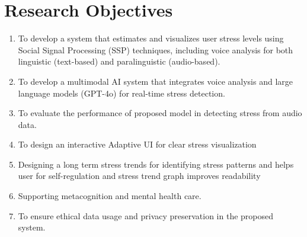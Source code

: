\documentclass[Arial,12pt,openright,twoside]{book}
\begin{document}
\section{Research Objectives}
\begin{enumerate}
    \item To develop a system that estimates and visualizes user stress levels using Social Signal Processing (SSP) techniques, including voice analysis for both linguistic (text-based) and paralinguistic (audio-based).
    \item To develop a multimodal AI system that integrates voice analysis and large language models (GPT-4o) for real-time stress detection.
    \item To evaluate the performance of proposed model in detecting stress from audio data.
    \item To design an interactive  Adaptive UI for clear stress visualization
    \item Designing a long term stress trends for identifying stress patterns and helps user for self-regulation and stress trend graph improves readability
    \item Supporting metacognition and mental health care.
    \item To ensure ethical data usage and privacy preservation in the proposed system.
\end{enumerate}
\end{document}

